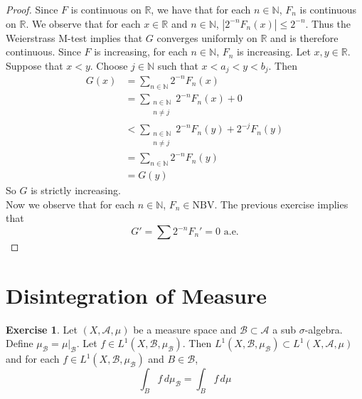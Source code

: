 \documentclass{book}
\theoremstyle{definition}
\newtheorem{ex}[definition]{Exercise}
\newcommand{\sig}{\sigma}
\newcommand{\N}{\mathbb{N}}
\newcommand{\R}{\mathbb{R}}
\newcommand{\MA}{\mathcal{A}}
\newcommand{\MB}{\mathcal{B}}
\newcommand{\lex}[1]{\label{ex:#1}}
\DeclareMathOperator*{\0}{\mbf{0}}
\DeclareMathOperator*{\1}{\mbf{1}}
\newcommand{\dmu}{\, d \mu}
\newcommand{\NBV}{\text{NBV}}
\begin{document}
	\begin{proof}
		Since $F$ is continuous on $\R$, we have that for each $n \in \N$, $F_n$ is continuous on $\R$. We observe that for each $x \in \R$ and $n \in \N$, $|2^{-n}F_n(x)| \leq 2^{-n}$. Thus the Weierstrass M-test implies that $G$ converges uniformly on $\R$ and is therefore continuous. Since $F$ is increasing, for each $n \in \N$, $F_n$ is increasing. Let $x, y \in \R$. Suppose that $x<y$. Choose $j \in \N$ such that $x<a_j<y<b_j$. Then 
		\begin{align*}
			G(x) 
			&= \sum_{n \in \N}2^{-n}F_n(x)\\
			&= \sum_{\substack{n \in \N\\ n \neq j}}2^{-n}F_n(x) + 0\\
			& < \sum_{\substack{n \in \N\\ n \neq j}}2^{-n}F_n(y) + 2^{-j}F_n(y)\\
			&=\sum_{n \in \N}2^{-n}F_n(y)\\
			&=G(y)
		\end{align*}
		So $G$ is strictly increasing.\\
		Now we observe that for each $n \in \N$, $F_n \in \NBV$. The previous exercise implies that $$G' = \sum 2^{-n}F_n'=0 \text{ a.e.}$$
	\end{proof}
	
	
	
	
	
	
	
	
	
	
	
	
	
	
	
	
	
	
	
	
	
	
	
	
	
	
	
	
	
	
	
	
	
	
	\newpage
	\section{Disintegration of Measure}
	
	\begin{ex} \lex{00000} 
		Let $(X, \MA, \mu)$ be a measure space and $\MB \subset \MA$ a sub $\sig$-algebra. Define $\mu_{\MB} = \mu|_{\MB}$. Let $f \in L^1(X, \MB, \mu_{\MB})$. Then $ L^1(X, \MB, \mu_{\MB}) \subset L^1(X, \MA, \mu)$ and for each $f \in L^1(X, \MB, \mu_{\MB})$ and $B \in \MB$, 
		$$\int_B f \dmu_{\MB} = \int_B f \dmu$$
	\end{ex}
	
\end{document}
